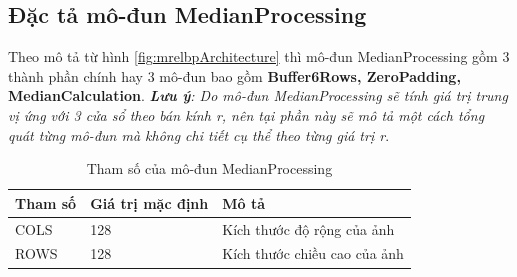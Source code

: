 \subsection{Đặc tả mô-đun MedianProcessing}
Theo mô tả từ hình \ref{fig:mrelbpArchitecture} thì mô-đun MedianProcessing gồm 3 thành phần chính hay 3 mô-đun bao gồm \textbf{Buffer6Rows, ZeroPadding, MedianCalculation}. \textit{\textbf{Lưu ý}: Do mô-đun MedianProcessing sẽ tính giá trị trung vị ứng với 3 cửa sổ theo bán kính r, nên tại phần này sẽ mô tả một cách tổng quát từng mô-đun mà không chi tiết cụ thể theo từng giá trị r}.
\begin{table}[!ht]
    \centering
    \renewcommand{\arraystretch}{1.3} %
        \caption{Tham số của mô-đun MedianProcessing}
    \begin{tabular}{|p{3cm} p{4cm} p{8cm}|}
        \hline
        \rowcolor{gray!30}
        \textbf{Tham số } & \textbf{Giá trị mặc định}  & \textbf{Mô tả} \\
        \hline
        COLS & 128 & Kích thước độ rộng của ảnh
        \\ \hline
        ROWS & 128 & Kích thước chiều cao của ảnh
        \\
        \hline
    \end{tabular}

    \label{tab:paramListMedianProcessing}
\end{table}

